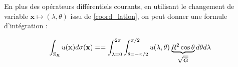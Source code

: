 En plus des opérateurs différentiels courants, en utilisant le changement de variable $\mathbf{x} \mapsto (\lambda, \theta)$ issu de \eqref{coord_latlon}, on peut donner une formule d'intégration :

\begin{equation}\label{integrale_lonlat}
\displaystyle\int_{\mathbb{S}_R} u(\mathbf{x})d\sigma(\mathbf{x})= = \displaystyle\int_{\lambda=0}^{2 \pi} \displaystyle\int_{\theta = - \pi/2}^{\pi/2} u(\lambda, \theta) \underbrace{R^2 \cos \theta}_{\sqrt{\overline{\mathbf{G}}}} d \theta d \lambda
\end{equation}
